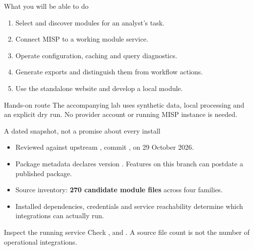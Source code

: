 \begin{frame}[t,plain]
    \titlepage
\end{frame}

\begin{frame}{What you will be able to do}
    \begin{enumerate}
        \item Select and discover modules for an analyst's task.
        \item Connect MISP to a working module service.
        \item Operate configuration, caching and query diagnostics.
        \item Generate exports and distinguish them from workflow actions.
        \item Use the standalone website and develop a local module.
    \end{enumerate}
    \begin{block}{Hands-on route}
        The accompanying lab uses synthetic data, local processing and an
        explicit dry run. No provider account or running MISP instance is needed.
    \end{block}
\end{frame}

\begin{frame}{A dated snapshot, not a promise about every install}
    \begin{itemize}
        \item Reviewed against upstream , commit ,
        on 29 October 2026.
        \item Package metadata declares version .
        Features on this branch can postdate a published package.
        \item Source inventory: \textbf{270 candidate module files} across four families.
        \item Installed dependencies, credentials and service reachability determine
        which integrations can actually run.
    \end{itemize}
    \begin{block}{Inspect the running service}
        Check ,  and .
        A source file count is not the number of operational integrations.
    \end{block}
\end{frame}

